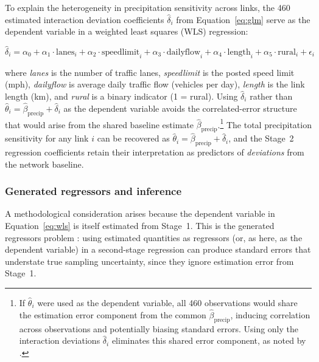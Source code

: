 \documentclass[review]{elsarticle}
\begin{document}
To explain the heterogeneity in precipitation sensitivity across links, the 460 estimated interaction deviation coefficients $\hat{\delta}_i$ from Equation~\eqref{eq:glm} serve as the dependent variable in a weighted least squares (WLS) regression:

\begin{equation}
\label{eq:wls}
\hat{\delta}_i = \alpha_0 + \alpha_1 \cdot \text{lanes}_i + \alpha_2 \cdot \text{speedlimit}_i + \alpha_3 \cdot \text{dailyflow}_i + \alpha_4 \cdot \text{length}_i + \alpha_5 \cdot \text{rural}_i + \epsilon_i
\end{equation}

\noindent where \textit{lanes} is the number of traffic lanes, \textit{speedlimit} is the posted speed limit (mph), \textit{dailyflow} is average daily traffic flow (vehicles per day), \textit{length} is the link length (km), and \textit{rural} is a binary indicator (1 = rural). Using $\hat{\delta}_i$ rather than $\hat{\theta}_i = \hat{\beta}_{\text{precip}} + \hat{\delta}_i$ as the dependent variable avoids the correlated-error structure that would arise from the shared baseline estimate $\hat{\beta}_{\text{precip}}$.\footnote{If $\hat{\theta}_i$ were used as the dependent variable, all 460 observations would share the estimation error component from the common $\hat{\beta}_{\text{precip}}$, inducing correlation across observations and potentially biasing standard errors. Using only the interaction deviations $\hat{\delta}_i$ eliminates this shared error component, as noted by \citet{pagan1984econometric}.} The total precipitation sensitivity for any link $i$ can be recovered as $\hat{\theta}_i = \hat{\beta}_{\text{precip}} + \hat{\delta}_i$, and the Stage~2 regression coefficients retain their interpretation as predictors of \textit{deviations} from the network baseline.

\subsubsection{Generated regressors and inference}

A methodological consideration arises because the dependent variable in Equation~\eqref{eq:wls} is itself estimated from Stage~1. This is the generated regressors problem \citep{pagan1984econometric}: using estimated quantities as regressors (or, as here, as the dependent variable) in a second-stage regression can produce standard errors that understate true sampling uncertainty, since they ignore estimation error from Stage~1.
\end{document}
